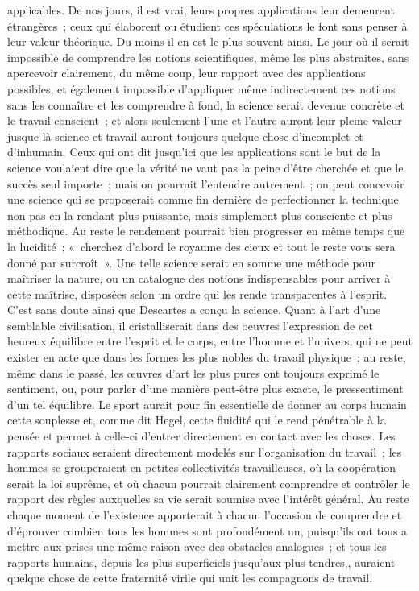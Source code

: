 \documentclass[french,twoside]{book} %
\begin{document}
applicables. De nos jours, il est vrai, leurs propres applications leur demeurent étrangères ; ceux qui élaborent ou étudient ces spéculations le font sans penser à leur valeur théorique. Du moins il en est le plus souvent ainsi. Le jour où il serait impossible de comprendre les notions scientifiques, même les plus abstraites, sans apercevoir clairement, du même coup, leur rapport avec des applications possibles, et également impossible d'appliquer même indirectement ces notions sans les connaître et les comprendre à fond, la science serait devenue concrète et le travail conscient ; et alors seulement l'une et l'autre auront leur pleine valeur jusque-là science et travail auront toujours quelque chose d'incomplet et d'inhumain. Ceux qui ont dit jusqu'ici que les applications sont le but de la science voulaient dire que la vérité ne vaut pas la peine d'être cherchée et que le succès seul importe ; mais on pourrait l'entendre autrement ; on peut concevoir une science qui se proposerait comme fin dernière de perfectionner la technique non pas en la rendant plus puissante, mais simplement plus consciente et plus méthodique. Au reste le rendement pourrait bien progresser en même temps que la lucidité ; « cherchez d'abord le royaume des cieux et tout le reste vous sera donné par surcroît ». Une telle science serait en somme une méthode pour maîtriser la nature, ou un catalogue des notions indispensables pour arriver à cette maîtrise, disposées selon un ordre qui les rende transparentes à l'esprit. C'est sans doute ainsi que Descartes a conçu la science. Quant à l'art d'une semblable civilisation, il cristalliserait dans des oeuvres l'expression de cet heureux équilibre entre l'esprit et le corps, entre l'homme et l'univers, qui ne peut exister en acte que dans les formes les plus nobles du travail physique ; au reste, même dans le passé, les œuvres d'art les plus pures ont toujours exprimé le sentiment, ou, pour parler d'une manière peut-être plus exacte, le pressentiment d'un tel équilibre. Le sport aurait pour fin essentielle de donner au corps humain cette souplesse et, comme dit Hegel, cette fluidité qui le rend pénétrable à la pensée et permet à celle-ci d'entrer directement en contact avec les choses. Les rapports sociaux seraient directement modelés sur l'organisation du travail ; les hommes se grouperaient en petites collectivités travailleuses, où la coopération serait la loi suprême, et où chacun pourrait clairement comprendre et contrôler le rapport des règles auxquelles sa vie serait soumise avec l'intérêt général. Au reste chaque moment de l'existence apporterait à chacun l'occasion de comprendre et d'éprouver combien tous les hommes sont profondément un, puisqu'ils ont tous a mettre aux prises une même raison avec des obstacles analogues ; et tous les rapports humains, depuis les plus superficiels jusqu'aux plus tendres,, auraient quelque chose de cette fraternité virile qui unit les compagnons de travail.\par
\end{document}
